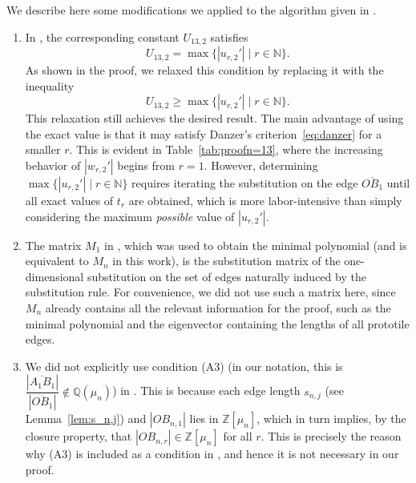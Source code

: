 \begin{rem}
We describe here some modifications we applied to the algorithm given in \cite{Danz02}.
\begin{enumerate}
\item In \cite{Danz02}, the corresponding constant \( U_{13,2} \) satisfies
\[
U_{13,2} = \max \{ |u_{r,2}'| \mid r \in \mathbb{N} \}.
\]
As shown in the proof, we relaxed this condition by replacing it with the inequality
\[
U_{13,2} \geq \max \{ |u_{r,2}'| \mid r \in \mathbb{N} \}.
\]
This relaxation still achieves the desired result. The main advantage of using the exact value is that it may satisfy Danzer’s criterion~\ref{eq:danzer} for a smaller \( r \). This is evident in Table~\ref{tab:proofn=13}, where the increasing behavior of \( |w_{r,2}'| \) begins from \( r = 1 \). However, determining \( \max \{ |u_{r,2}'| \mid r \in \mathbb{N} \} \) requires iterating the substitution on the edge \( \overline{OB_{1}} \) until all exact values of \( t_r \) are obtained, which is more labor-intensive than simply considering the maximum \textit{possible} value of \( |u_{r,2}'| \).

\item The matrix \(M_1\) in \cite{Danz02}, which was used to obtain the minimal polynomial (and is equivalent to \(M_n\) in this work), is the substitution matrix of the one-dimensional substitution on the set of edges naturally induced by the substitution rule. For convenience, we did not use such a matrix here, since \(M_n\) already contains all the relevant information for the proof, such as the minimal polynomial and the eigenvector containing the lengths of all prototile edges.

\item We did not explicitly use condition (A3) (in our notation, this is $\dfrac{|\overline{A_1B_1}|}{|\overline{OB_1}|} \notin \mathbb{Q}(\mu_n)$) in \cite{Danz02}. This is because each edge length \(s_{n,j}\) (see Lemma~\ref{lem:s_n,j}) and \(|OB_{n,1}|\) lies in \(\mathbb{Z}[\mu_n]\), which in turn implies, by the closure property, that \(|OB_{n,r}| \in \mathbb{Z}[\mu_n]\) for all \(r\). This is precisely the reason why (A3) is included as a condition in \cite{Danz02}, and hence it is not necessary in our proof.
\end{enumerate}
\end{rem}

